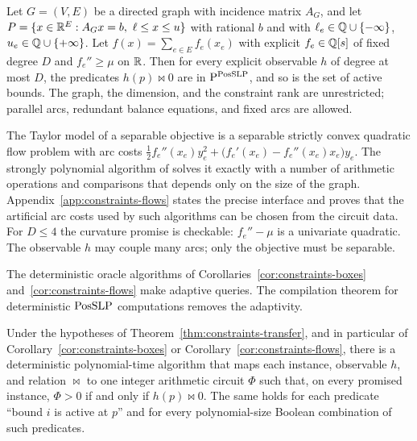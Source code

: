 \begin{corollary}
\label{cor:constraints-flows}
Let $G=(V,E)$ be a directed graph with incidence matrix $A_G$, and let
$P=\{x\in\mathbb R^E:A_Gx=b,\ \ell\le x\le u\}$ with rational $b$ and with
$\ell_e\in\mathbb Q\cup\{-\infty\}$, $u_e\in\mathbb Q\cup\{+\infty\}$. Let
$f(x)=\sum_{e\in E}f_e(x_e)$ with explicit $f_e\in\mathbb Q[s]$ of fixed degree $D$
and $f_e''\ge\mu$ on $\mathbb R$. Then for every explicit observable $h$ of degree at
most $D$, the predicates $h(p)\bowtie0$ are in $\mathrm P^{\mathrm{PosSLP}}$, and so is
the set of active bounds. The graph, the dimension, and the constraint rank
are unrestricted; parallel arcs, redundant balance equations, and fixed arcs
are allowed.
\end{corollary}

The Taylor model of a separable objective is a separable strictly convex
quadratic flow problem with arc costs
$\tfrac12f_e''(x_e)y_e^2+\bigl(f_e'(x_e)-f_e''(x_e)x_e\bigr)y_e$. The strongly
polynomial algorithm of \citet[Theorem~20]{Vegh2016} solves it exactly with a
number of arithmetic operations and comparisons that depends only on the size
of the graph. Appendix~\ref{app:constraints-flows} states the precise
interface and proves that the artificial arc costs used by such algorithms can
be chosen from the circuit data. For $D\le4$ the curvature promise is
checkable: $f_e''-\mu$ is a univariate quadratic. The observable $h$ may
couple many arcs; only the objective must be separable.

The deterministic oracle algorithms of
Corollaries~\ref{cor:constraints-boxes} and~\ref{cor:constraints-flows} make
adaptive queries. The compilation theorem for deterministic $\mathrm{PosSLP}$
computations removes the adaptivity.

\begin{corollary}
\label{cor:structured-single-sign}
Under the hypotheses of Theorem~\ref{thm:constraints-transfer}, and in
particular of Corollary~\ref{cor:constraints-boxes} or
Corollary~\ref{cor:constraints-flows}, there is a deterministic
polynomial-time algorithm that maps each instance, observable $h$, and relation
${\bowtie}$ to one integer arithmetic circuit $\Phi$ such that, on every
promised instance, $\Phi>0$ if and only if $h(p)\bowtie0$. The same holds for
each predicate ``bound $i$ is active at $p$'' and for every polynomial-size
Boolean combination of such predicates.
\end{corollary}

